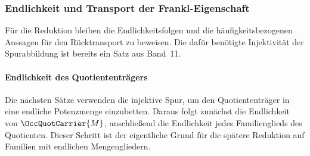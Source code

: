 \documentclass[main.tex]{subfiles}
\begin{document}
\begin{tabproof}
\end{tabproof}

\subsubsection{Endlichkeit und Transport der Frankl-Eigenschaft}

Für die Reduktion bleiben die Endlichkeitsfolgen und die
häufigkeitsbezogenen Aussagen für den Rücktransport zu beweisen. Die dafür
benötigte Injektivität der Spurabbildung ist bereits ein Satz aus Band~11.

\paragraph{Endlichkeit des Quotiententrägers}

Die nächsten Sätze verwenden die injektive Spur, um den Quotiententräger in
eine endliche Potenzmenge einzubetten. Daraus folgt zunächst die Endlichkeit von
\(\OccQuotCarrier{M}\), anschließend die Endlichkeit jedes Familienglieds des
Quotienten. Dieser Schritt ist der eigentliche Grund für die spätere Reduktion
auf Familien mit endlichen Mengengliedern.
\end{document}
